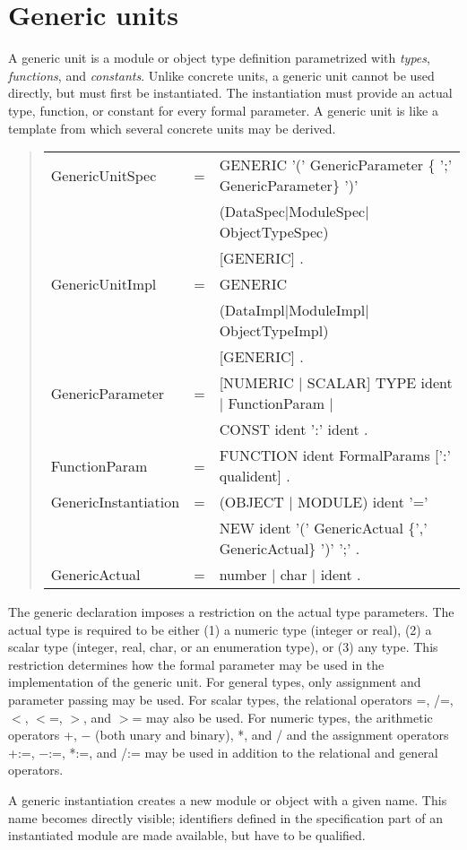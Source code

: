 \documentclass[10pt]{article}
\newenvironment{grammar}
{\begin{quote} \begin{tabular}{p{3.8cm} l l}}
{\end{tabular}\end{quote}}
\begin{document}
\section{Generic units}\label{sec:generics}

A generic unit is a module or object type definition
parametrized with {\em types}, {\em functions}, and {\em constants}.
Unlike concrete units, a generic unit cannot be used directly,
but must first be instantiated.
The instantiation must provide an actual type, function, or constant for every
formal parameter.
A generic unit is like a template from which several concrete units
may be derived.
\begin{grammar}
GenericUnitSpec & = & GENERIC '(' GenericParameter \{ ';' GenericParameter\} ')' \\
& & (DataSpec$|$ModuleSpec$|$ObjectTypeSpec) \\
& & [GENERIC] . \\
GenericUnitImpl & = & GENERIC \\
& & (DataImpl$|$ModuleImpl$|$ObjectTypeImpl) \\
& & [GENERIC] . \\
GenericParameter & = & [NUMERIC $|$ SCALAR] TYPE ident $|$ FunctionParam $|$ \\
& & CONST ident ':' ident . \\
FunctionParam & = & FUNCTION ident FormalParams [':' qualident] . \\
GenericInstantiation & = & (OBJECT $|$ MODULE) ident '=' \\
& & NEW ident '(' GenericActual \{',' GenericActual\} ')' ';' . \\
GenericActual & = & number $|$ char $|$ ident .
\end{grammar}
The generic declaration imposes a restriction on
the actual type parameters.
The actual type is required to be either (1) a numeric type
(integer or real), (2) a scalar type (integer, real, char, or
an enumeration type), or (3) any type.
This restriction determines how the formal parameter may be used
in the implementation of the generic unit.
For general types, only assignment and parameter passing may be used.
For scalar types, the relational operators =, /=, $<$, $<$=, $>$, and $>$= may
also be used.
For numeric types, the arithmetic operators +, $-$
(both unary and binary), *, and / and the assignment
operators +:=, $-$:=, *:=, and /:= may be used in addition to the relational
and general operators.

A generic instantiation creates a new module or object with a given name.
This name becomes directly visible; identifiers defined
in the specification part of an instantiated
module are made available, but have to
be qualified.
\end{document}
